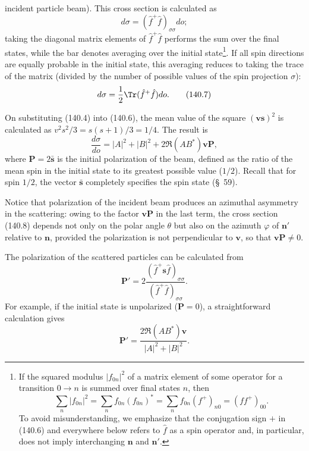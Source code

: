 incident particle beam). This cross section is calculated as
\begin{equation}d\sigma=(\hat f^+\hat f)_{\sigma\sigma}d o;\tag{140.6}\end{equation}
taking the diagonal matrix elements of $\hat f^+\hat f$ performs the sum over the final states, while the bar denotes averaging over the initial state\footnote{If the squared modulus $|f_{0n}|^2$ of a matrix element of some operator for a transition $0\to n$ is summed over final states $n$, then
\[
 \sum_n|f_{0n}|^2=\sum_nf_{0n}(f_{0n})^*=\sum_nf_{0n}(f^+)_{n0}=(ff^+)_{00}.
\]
To avoid misunderstanding, we emphasize that the conjugation sign $+$ in (140.6) and everywhere below refers to $\hat f$ as a spin operator and, in particular, does not imply interchanging $\mathbf n$ and $\mathbf n'$.}. If all spin directions are equally probable in the initial state, this averaging reduces to taking the trace of the matrix (divided by the number of possible values of the spin projection $\sigma$):
\begin{equation}d\sigma=\frac12\Tr(\hat f^+\hat f)d o.\tag{140.7}\end{equation}

On substituting (140.4) into (140.6), the mean value of the square $(\mathbf v\mathbf s)^2$ is calculated as $v^2s^2/3=s(s+1)/3=1/4$. The result is
\begin{equation}\frac{d\sigma}{d o}=|A|^2+|B|^2+2\Re(AB^*)\mathbf v\mathbf P,\tag{140.8}\end{equation}
where $\mathbf P=2\bar{\mathbf s}$ is the initial polarization of the beam, defined as the ratio of the mean spin in the initial state to its greatest possible value ($1/2$). Recall that for spin $1/2$, the vector $\bar{\mathbf s}$ completely specifies the spin state (\S~59).

Notice that polarization of the incident beam produces an azimuthal asymmetry in the scattering: owing to the factor $\mathbf v\mathbf P$ in the last term, the cross section (140.8) depends not only on the polar angle $\theta$ but also on the azimuth $\varphi$ of $\mathbf n'$ relative to $\mathbf n$, provided the polarization is not perpendicular to $\mathbf v$, so that $\mathbf v\mathbf P\ne0$.

The polarization of the scattered particles can be calculated from
\begin{equation}\mathbf P'=2\frac{(\hat f^+\mathbf s\hat f)_{\sigma\sigma}}{(\hat f^+\hat f)_{\sigma\sigma}}.\tag{140.9}\end{equation}
For example, if the initial state is unpolarized ($\mathbf P=0$), a straightforward calculation gives
\begin{equation}\mathbf P'=\frac{2\Re(AB^*)\mathbf v}{|A|^2+|B|^2}.\tag{140.10}\end{equation}

